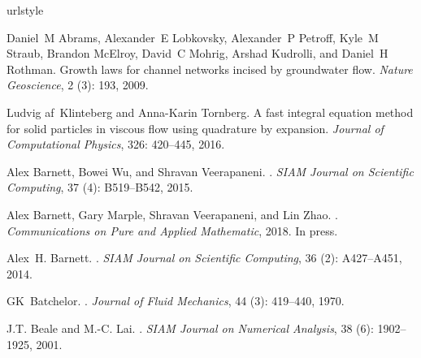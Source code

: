 \documentclass[preprint, 10pt]{elsarticle}
\begin{document}
\begin{thebibliography}{72}
\providecommand{\natexlab}[1]{#1}
\providecommand{\url}[1]{\texttt{#1}}
\expandafter\ifx\csname urlstyle\endcsname\relax
  \providecommand{\doi}[1]{doi: #1}\else
  \providecommand{\doi}{doi: \begingroup \urlstyle{rm}\Url}\fi

Daniel~M Abrams, Alexander~E Lobkovsky, Alexander~P Petroff, Kyle~M Straub,
  Brandon McElroy, David~C Mohrig, Arshad Kudrolli, and Daniel~H Rothman.
\newblock Growth laws for channel networks incised by groundwater flow.
\newblock \emph{Nature Geoscience}, 2 (3): 193, 2009.

Ludvig af~Klinteberg and Anna-Karin Tornberg.
\newblock A fast integral equation method for solid particles in viscous flow
  using quadrature by expansion.
\newblock \emph{Journal of Computational Physics}, 326: 420--445,
  2016.

Alex Barnett, Bowei Wu, and Shravan Veerapaneni.
.
\newblock \emph{SIAM Journal on Scientific Computing}, 37
  (4): B519--B542, 2015.

Alex Barnett, Gary Marple, Shravan Veerapaneni, and Lin Zhao.
.
\newblock \emph{Communications on Pure and Applied Mathematic}, 2018.
\newblock In press.

Alex~H. Barnett.
.
\newblock \emph{SIAM Journal on Scientific Computing}, 36
  (2): A427--A451, 2014.

GK~Batchelor.
.
\newblock \emph{Journal of Fluid Mechanics}, 44 (3):
  419--440, 1970.

J.T. Beale and M.-C. Lai.
.
\newblock \emph{SIAM Journal on Numerical Analysis}, 38 (6):
  1902--1925, 2001.


\end{thebibliography}
\end{document}
